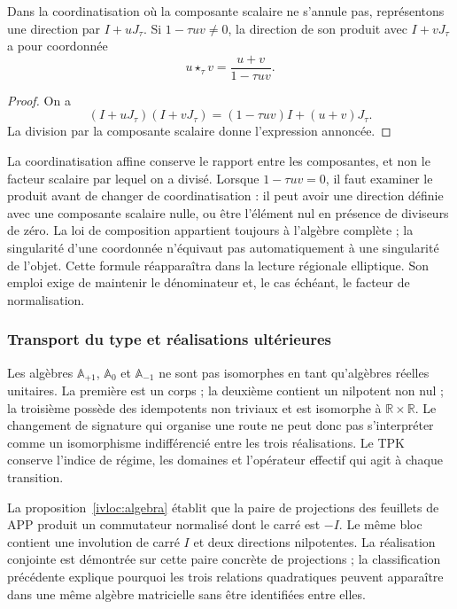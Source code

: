 \begin{proposition}
\label{trit-ampl-prop-pendientes}
Dans la coordinatisation où la composante scalaire ne s'annule pas, représentons une
direction par \(I+uJ_\tau\). Si \(1-\tau uv\ne0\), la direction de son
produit avec \(I+vJ_\tau\) a pour coordonnée
\[
 u\star_\tau v=\frac{u+v}{1-\tau uv}.
\]
\end{proposition}
\begin{proof}
On a
\[
 (I+uJ_\tau)(I+vJ_\tau)
   =(1-\tau uv)I+(u+v)J_\tau.
\]
La division par la composante scalaire donne l'expression annoncée.
\end{proof}

La coordinatisation affine conserve le rapport entre les composantes, et non le facteur scalaire
par lequel on a divisé. Lorsque \(1-\tau uv=0\), il faut examiner le produit avant de
changer de coordinatisation : il peut avoir une direction définie avec une composante scalaire
nulle, ou être l'élément nul en présence de diviseurs de zéro. La loi de
composition appartient toujours à l'algèbre complète ; la singularité d'une
coordonnée n'équivaut pas automatiquement à une singularité de l'objet.
Cette formule réapparaîtra dans la lecture régionale elliptique. Son emploi exige
de maintenir le dénominateur et, le cas échéant, le facteur de normalisation.

\subsubsection{Transport du type et réalisations ultérieures}
\label{trit-ampl-puentes}

Les algèbres \(\mathbb A_{+1}\), \(\mathbb A_0\) et
\(\mathbb A_{-1}\) ne sont pas isomorphes en tant qu'algèbres réelles unitaires.
La première est un corps ; la deuxième contient un nilpotent non nul ; la
troisième possède des idempotents non triviaux et est isomorphe à
\(\mathbb R\times\mathbb R\). Le changement de signature qui organise une
route ne peut donc pas s'interpréter comme un isomorphisme indifférencié entre les
trois réalisations. Le TPK conserve l'indice de régime, les domaines et
l'opérateur effectif qui agit à chaque transition.



La proposition~\ref{ivloc:algebra} établit que la paire de projections des feuillets de APP
produit un commutateur normalisé dont le carré est \(-I\). Le même bloc
contient une involution de carré \(I\) et deux directions nilpotentes. La
réalisation conjointe est démontrée sur cette paire concrète de projections ;
la classification précédente explique pourquoi les trois relations quadratiques
peuvent apparaître dans une même algèbre matricielle sans être identifiées entre elles.

